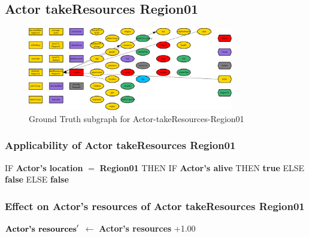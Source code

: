 \documentclass{article}%
\begin{document}
%
\subsection{Actor takeResources Region01}%
\label{subsec:Actor takeResources Region01}%


\begin{figure}[ht]%
\centering%
\includegraphics[width=0.8\textwidth]{images/Actor-takeResources-Region01.png}%
\caption{Ground Truth subgraph for Actor{-}takeResources{-}Region01}%
\end{figure}

%
\subsubsection{Applicability of Actor takeResources Region01}%
\label{ssubsec:Applicability of Actor takeResources Region01}%
\begin{flushleft}%
IF %
\textbf{Actor's location}%
$=$%
\textbf{Region01}%
\linebreak%
\hspace*{2em}%
THEN %
IF %
\textbf{Actor's alive}%
\linebreak%
\hspace*{4em}%
THEN %
\textbf{true}%
\linebreak%
\hspace*{4em}%
ELSE %
\textbf{false}%
\linebreak%
\hspace*{2em}%
ELSE %
\textbf{false}%
\end{flushleft}

%
\subsubsection{Effect on Actor's resources of Actor takeResources Region01}%
\label{ssubsec:Effect on Actor's resources of Actor takeResources Region01}%
\begin{flushleft}%
$\mbox{\textbf{Actor's resources}} '$%
$\leftarrow$%
\textbf{Actor's resources}%
+1.00%
\end{flushleft}
\end{document}
